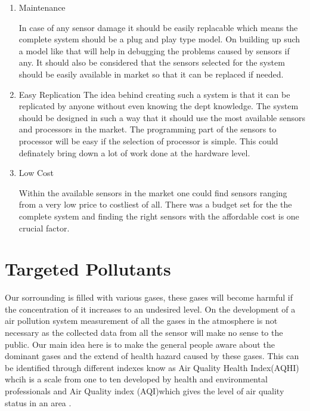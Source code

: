 \documentclass[11pt]{article}
\begin{document}
\begin {enumerate}
\item {Maintenance}

In case of any sensor damage it should be easily replacable which means the complete system should be a plug and play type model. On building up such a  model like that will help in debugging the problems caused by sensors if any. It should also be considered that the sensors selected for the system should be easily available in market so that it can be replaced if needed.

\item {Easy Replication}
The idea behind creating such a system is that it can be replicated by anyone without even knowing the dept knowledge. The system should be designed in such a way that it should use the most available sensors and processors in the market. The programming part of the sensors to processor will be easy if the selection of processor is simple. This could definately bring down a lot of work done at the hardware level.


\item {Low Cost}

Within the available sensors in the market one could find sensors ranging from a very low price to costliest of all. There was a budget set for the the complete system and finding the right sensors with the affordable cost is one crucial factor.

\end{enumerate}


\section*{Targeted Pollutants}

Our sorrounding is filled with various gases, these gases will become harmful if the concentration of it increases to an undesired level. On the development of a air pollution system measurement of all the gases in the atmosphere is not necessary as the collected data from all the sensor will make no sense to the public. Our main idea here is to make the general people aware about the dominant gases and the extend of health hazard caused by these gases. This can be identified through different indexes know as Air Quality Health Index(AQHI) whcih is a scale from one to ten developed by health and environmental professionals \cite{Questions} and Air Quality index (AQI)which gives the level of air quality status in an area \cite{Asha2017}.

\par 
\end{document}
